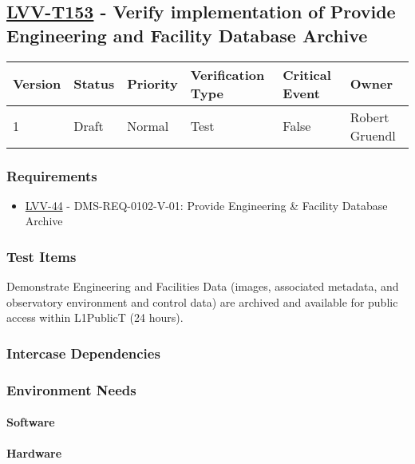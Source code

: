 \subsection{\href{https://jira.lsstcorp.org/secure/Tests.jspa\#/testCase/LVV-T153}{LVV-T153}
    - Verify implementation of Provide Engineering and Facility Database Archive}\label{lvv-t153}

\begin{longtable}[]{llllll}
\toprule
Version & Status & Priority & Verification Type & Critical Event & Owner
\\\midrule
1 & Draft & Normal &
Test & False & Robert Gruendl
\\\bottomrule
\end{longtable}

\subsubsection{Requirements}
\begin{itemize}
\item \href{https://jira.lsstcorp.org/browse/LVV-44}{LVV-44} - DMS-REQ-0102-V-01: Provide Engineering \& Facility Database Archive
\end{itemize}

\subsubsection{Test Items}
Demonstrate Engineering and Facilities Data (images, associated
metadata, and observatory environment and control data) are archived and
available for public access within L1PublicT (24 hours).~



\subsubsection{Intercase Dependencies}

\subsubsection{Environment Needs}

\paragraph{Software}

\paragraph{Hardware}

